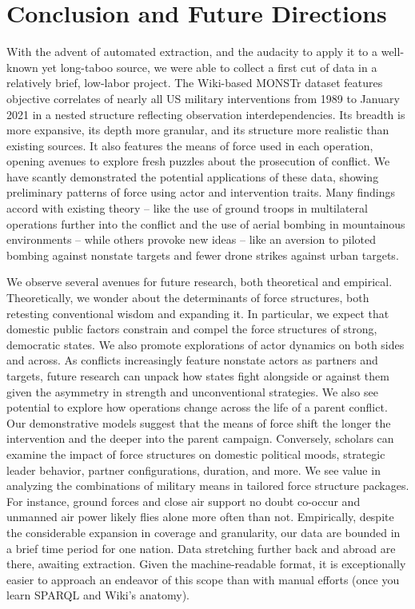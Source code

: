 \documentclass[fleqn,12pt]{article}
\begin{document}
\section*{Conclusion and Future Directions}
With the advent of automated extraction, and the audacity to apply it to a well-known yet long-taboo source, we were able to collect a first cut of data in a relatively brief, low-labor project. The Wiki-based MONSTr dataset features objective correlates of nearly all US military interventions from 1989 to January 2021 in a nested structure reflecting observation interdependencies. Its breadth is more expansive, its depth more granular, and its structure more realistic than existing sources. It also features the means of force used in each operation, opening avenues to explore fresh puzzles about the prosecution of conflict. We have scantly demonstrated the potential applications of these data, showing preliminary patterns of force using actor and intervention traits. Many findings accord with existing theory -- like the use of ground troops in multilateral operations further into the conflict and the use of aerial bombing in mountainous environments -- while others provoke new ideas -- like an aversion to piloted bombing against nonstate targets and fewer drone strikes against urban targets.

We observe several avenues for future research, both theoretical and empirical. Theoretically, we wonder about the determinants of force structures, both retesting conventional wisdom and expanding it. In particular, we expect that domestic public factors constrain and compel the force structures of strong, democratic states. We also promote explorations of actor dynamics on both sides and across. As conflicts increasingly feature nonstate actors as partners and targets, future research can unpack how states fight alongside or against them given the asymmetry in strength and unconventional strategies. We also see potential to explore how operations change across the life of a parent conflict. Our demonstrative models suggest that the means of force shift the longer the intervention and the deeper into the parent campaign. Conversely, scholars can examine the impact of force structures on domestic political moods, strategic leader behavior, partner configurations, duration, and more. We see value in analyzing the combinations of military means in tailored force structure packages. For instance, ground forces and close air support no doubt co-occur and unmanned air power likely flies alone more often than not. Empirically, despite the considerable expansion in coverage and granularity, our data are bounded in a brief time period for one nation. Data stretching further back and abroad are there, awaiting extraction. Given the machine-readable format, it is exceptionally easier to approach an endeavor of this scope than with manual efforts (once you learn SPARQL and Wiki's anatomy). 
\end{document}

